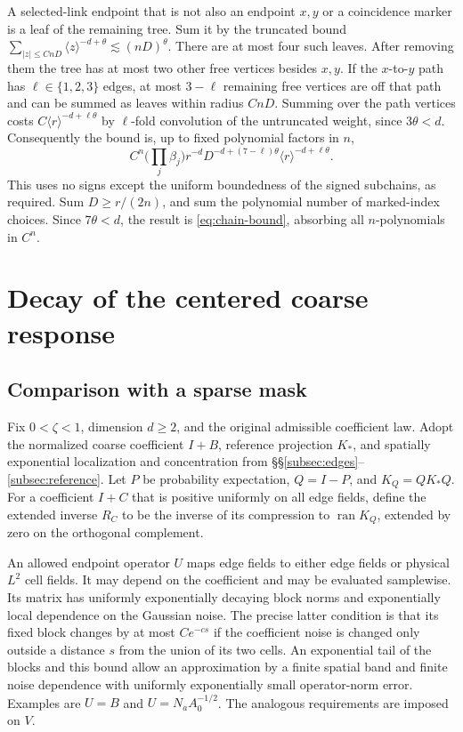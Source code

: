 \documentclass[11pt]{article}
\begin{document}
A selected-link endpoint that is not also an endpoint \(x,y\) or a coincidence marker is a leaf of the remaining tree. Sum it by the truncated bound \(\sum_{|z|\le CnD}\langle z\rangle^{-d+\theta}\lesssim (nD)^\theta\). There are at most four such leaves. After removing them the tree has at most two other free vertices besides \(x,y\). If the \(x\)-to-\(y\) path has \(\ell\in\{1,2,3\}\) edges, at most \(3-\ell\) remaining free vertices are off that path and can be summed as leaves within radius \(CnD\). Summing over the path vertices costs \(C\langle r\rangle^{-d+\ell\theta}\) by \(\ell\)-fold convolution of the untruncated weight, since \(3\theta<d\). Consequently the bound is, up to fixed polynomial factors in \(n\), \[
C^n\Big(\prod_j\beta_j\Big)
r^{-d}D^{-d+(7-\ell)\theta}\langle r\rangle^{-d+\ell\theta}.
\] This uses no signs except the uniform boundedness of the signed subchains, as required. Sum \(D\ge r/(2n)\), and sum the polynomial number of marked-index choices. Since \(7\theta<d\), the result is \eqref{eq:chain-bound}, absorbing all \(n\)-polynomials in \(C^n\).

\section{Decay of the centered coarse response}\label{sec:mask}

\subsection{Comparison with a sparse mask}\label{subsec:mask}

Fix \(0<\zeta<1\), dimension \(d\ge2\), and the original admissible coefficient law. Adopt the normalized coarse coefficient \(I+B\), reference projection \(K_*\), and spatially exponential localization and concentration from \S\S\ref{subsec:edges}--\ref{subsec:reference}. Let \(P\) be probability expectation, \(Q=I-P\), and \(K_Q=QK_*Q\). For a coefficient \(I+C\) that is positive uniformly on all edge fields, define the extended inverse \(R_C\) to be the inverse of its compression to \(\operatorname{ran}K_Q\), extended by zero on the orthogonal complement.

An allowed endpoint operator \(U\) maps edge fields to either edge fields or physical \(L^2\) cell fields. It may depend on the coefficient and may be evaluated samplewise. Its matrix has uniformly exponentially decaying block norms and exponentially local dependence on the Gaussian noise. The precise latter condition is that its fixed block changes by at most \(C e^{-cs}\) if the coefficient noise is changed only outside a distance \(s\) from the union of its two cells. An exponential tail of the blocks and this bound allow an approximation by a finite spatial band and finite noise dependence with uniformly exponentially small operator-norm error. Examples are \(U=B\) and \(U=N_a A_0^{-1/2}\). The analogous requirements are imposed on \(V\).
\end{document}
